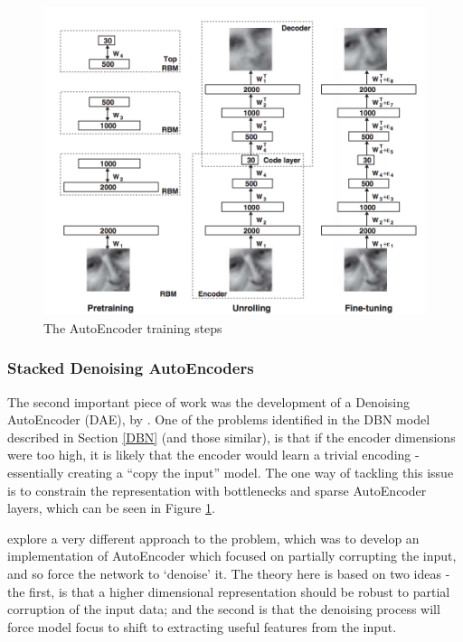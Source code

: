 \documentclass[a4paper,11pt,oneside]{article}
\theoremstyle{plain}
\theoremstyle{definition}
\begin{document}
	\begin{figure}
		\centering \includegraphics[scale=0.5]{images/DBN-RBM-process.png}
		\caption[The AutoEncoder Training Steps]{The AutoEncoder training steps \citep{Hinton2}}
		\label{figure-DBN-RBM}
	\end{figure}
	
	\subsubsection{Stacked Denoising AutoEncoders}\label{lr_SDAE}
	
	The second important piece of work was the development of a Denoising AutoEncoder (DAE), by \citet{Vincent}. 
	One of the problems identified in the DBN model described in Section \ref{DBN} (and those similar), is that if the encoder dimensions were too high, 
	it is likely that the encoder would learn a trivial encoding - essentially creating a ``copy the input'' model. The one way
	of tackling this issue is to constrain the representation with bottlenecks and sparse AutoEncoder layers, which can be seen in Figure \ref{figure-DBN-RBM}.
	\hfill \break 
	
	\citet{Vincent} explore a very different approach to the problem, which was to develop an implementation of 
	AutoEncoder which focused on partially corrupting the input, and so force the network to `denoise' it. The theory 
	here is based on two ideas - the first, is that a higher dimensional representation should be robust to partial 
	corruption of the input data; and the second is that the denoising process will force model focus to shift to 
	extracting useful features from the input.
	\hfill \break 
	
\end{document}

